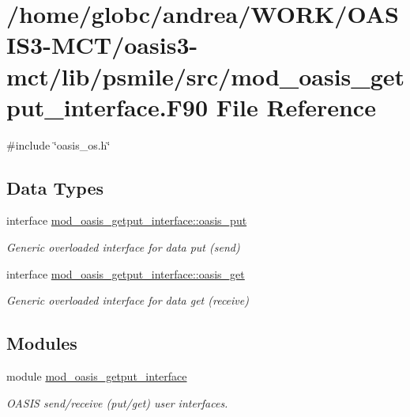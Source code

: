 \hypertarget{mod__oasis__getput__interface_8_f90}{}\section{/home/globc/andrea/\+W\+O\+R\+K/\+O\+A\+S\+I\+S3-\/\+M\+C\+T/oasis3-\/mct/lib/psmile/src/mod\+\_\+oasis\+\_\+getput\+\_\+interface.F90 File Reference}
\label{mod__oasis__getput__interface_8_f90}
{\ttfamily \#include \char`\"{}oasis\+\_\+os.\+h\char`\"{}}\newline
\subsection*{Data Types}
\begin{DoxyCompactItemize}
\item 
interface \hyperlink{interfacemod__oasis__getput__interface_1_1oasis__put}{mod\+\_\+oasis\+\_\+getput\+\_\+interface\+::oasis\+\_\+put}
\begin{DoxyCompactList}\small\item\em Generic overloaded interface for data put (send) \end{DoxyCompactList}\item 
interface \hyperlink{interfacemod__oasis__getput__interface_1_1oasis__get}{mod\+\_\+oasis\+\_\+getput\+\_\+interface\+::oasis\+\_\+get}
\begin{DoxyCompactList}\small\item\em Generic overloaded interface for data get (receive) \end{DoxyCompactList}\end{DoxyCompactItemize}
\subsection*{Modules}
\begin{DoxyCompactItemize}
\item 
module \hyperlink{namespacemod__oasis__getput__interface}{mod\+\_\+oasis\+\_\+getput\+\_\+interface}
\begin{DoxyCompactList}\small\item\em O\+A\+S\+IS send/receive (put/get) user interfaces. \end{DoxyCompactList}\end{DoxyCompactItemize}

